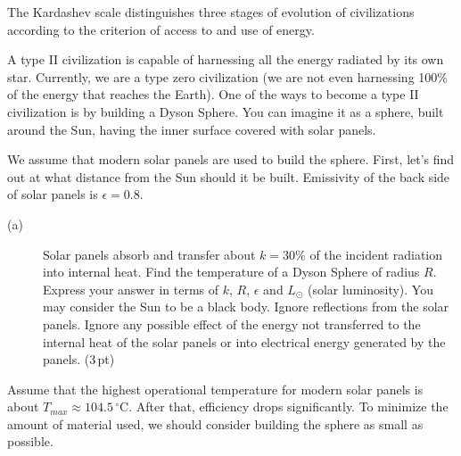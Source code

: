 The Kardashev scale distinguishes three stages of evolution of civilizations
according to the criterion of access to and use of energy.

A type II civilization is capable of harnessing all the energy radiated by its
own star. Currently, we are a type zero civilization (we are not even
harnessing 100\% of the energy that reaches the Earth). One of the ways to
become a type II civilization is by building a Dyson Sphere. You can imagine
it as a sphere, built around the Sun, having the inner surface covered with
solar panels.

We assume that modern solar panels are used to build the sphere. First, let's
find out at what distance from the Sun should it be built. Emissivity of the
back side of solar panels is $\epsilon = 0.8$.

\begin{description}
\item[(a)] Solar panels absorb and transfer about $k = 30\%$ of the incident
  radiation into internal heat. Find the temperature of a Dyson Sphere of
  radius $R$. Express your answer in terms of $k$, $R$, $\epsilon$ and
  $L_\odot$ (solar luminosity). You may consider the Sun to be a black body.
  Ignore reflections from the solar panels. Ignore any possible effect of the
  energy not transferred to the internal heat of the solar panels or into
  electrical energy generated by the panels. \hfill(3\,pt)
\end{description}

Assume that the highest operational temperature for modern solar panels is
about $T_{max} \approx 104.5\,^\circ$C. After that, efficiency drops
significantly. To minimize the amount of material used, we should consider
building the sphere as small as possible.


